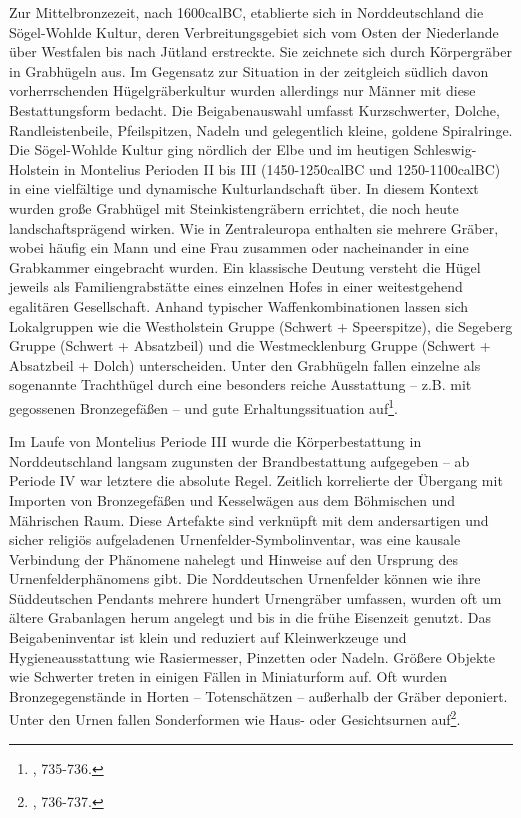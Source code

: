\documentclass[openany,twoside,twocolumn]{book}
\let\rmarkdownfootnote\footnote%
\def\footnote{\protect\rmarkdownfootnote}
\begin{document}
Zur Mittelbronzezeit, nach 1600calBC, etablierte sich in Norddeutschland
die Sögel-Wohlde Kultur, deren Verbreitungsgebiet sich vom Osten der
Niederlande über Westfalen bis nach Jütland erstreckte. Sie zeichnete
sich durch Körpergräber in Grabhügeln aus. Im Gegensatz zur Situation in
der zeitgleich südlich davon vorherrschenden Hügelgräberkultur wurden
allerdings nur Männer mit diese Bestattungsform bedacht. Die
Beigabenauswahl umfasst Kurzschwerter, Dolche, Randleistenbeile,
Pfeilspitzen, Nadeln und gelegentlich kleine, goldene Spiralringe. Die
Sögel-Wohlde Kultur ging nördlich der Elbe und im heutigen
Schleswig-Holstein in Montelius Perioden II bis III (1450-1250calBC und
1250-1100calBC) in eine vielfältige und dynamische Kulturlandschaft
über. In diesem Kontext wurden große Grabhügel mit Steinkistengräbern
errichtet, die noch heute landschaftsprägend wirken. Wie in
Zentraleuropa enthalten sie mehrere Gräber, wobei häufig ein Mann und
eine Frau zusammen oder nacheinander in eine Grabkammer eingebracht
wurden. Ein klassische Deutung versteht die Hügel jeweils als
Familiengrabstätte eines einzelnen Hofes in einer weitestgehend
egalitären Gesellschaft. Anhand typischer Waffenkombinationen lassen
sich Lokalgruppen wie die Westholstein Gruppe (Schwert + Speerspitze),
die Segeberg Gruppe (Schwert + Absatzbeil) und die Westmecklenburg
Gruppe (Schwert + Absatzbeil + Dolch) unterscheiden. Unter den
Grabhügeln fallen einzelne als sogenannte Trachthügel durch eine
besonders reiche Ausstattung -- z.B. mit gegossenen Bronzegefäßen -- und
gute Erhaltungssituation auf\footnote{\textcite{jockenhovel_germany_2013},
  735-736.}.

Im Laufe von Montelius Periode III wurde die Körperbestattung in
Norddeutschland langsam zugunsten der Brandbestattung aufgegeben -- ab
Periode IV war letztere die absolute Regel. Zeitlich korrelierte der
Übergang mit Importen von Bronzegefäßen und Kesselwägen aus dem
Böhmischen und Mährischen Raum. Diese Artefakte sind verknüpft mit dem
andersartigen und sicher religiös aufgeladenen
Urnenfelder-Symbolinventar, was eine kausale Verbindung der Phänomene
nahelegt und Hinweise auf den Ursprung des Urnenfelderphänomens gibt.
Die Norddeutschen Urnenfelder können wie ihre Süddeutschen Pendants
mehrere hundert Urnengräber umfassen, wurden oft um ältere Grabanlagen
herum angelegt und bis in die frühe Eisenzeit genutzt. Das
Beigabeninventar ist klein und reduziert auf Kleinwerkzeuge und
Hygieneausstattung wie Rasiermesser, Pinzetten oder Nadeln. Größere
Objekte wie Schwerter treten in einigen Fällen in Miniaturform auf. Oft
wurden Bronzegegenstände in Horten -- Totenschätzen -- außerhalb der
Gräber deponiert. Unter den Urnen fallen Sonderformen wie Haus- oder
Gesichtsurnen auf\footnote{\textcite{jockenhovel_germany_2013}, 736-737.}.
\end{document}

